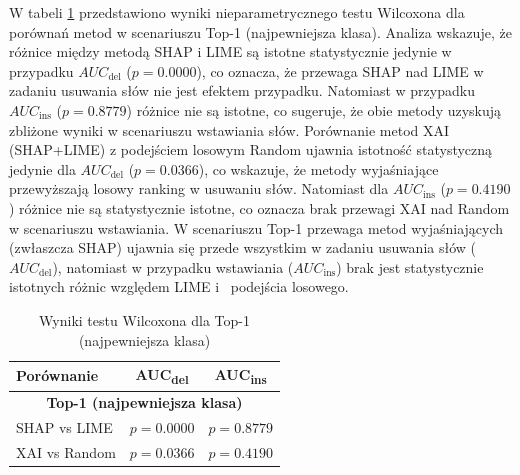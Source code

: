\documentclass[wmii, inf, mgr]{uwmthesis}
\begin{document}
W tabeli \ref{tab:wilcoxon_top1} przedstawiono wyniki nieparametrycznego testu Wilcoxona dla porównań metod w scenariuszu Top-1 (najpewniejsza klasa). Analiza wskazuje, że różnice między metodą SHAP i LIME są istotne statystycznie jedynie w przypadku $AUC_{\text{del}}$ ($p = 0.0000$), co oznacza, że przewaga SHAP nad LIME w zadaniu usuwania słów nie jest efektem przypadku. Natomiast w przypadku $AUC_{\text{ins}}$ ($p = 0.8779$) różnice nie są istotne, co sugeruje, że obie metody uzyskują zbliżone wyniki w scenariuszu wstawiania słów. Porównanie metod XAI (SHAP+LIME) z podejściem losowym Random ujawnia istotność statystyczną jedynie dla $AUC_{\text{del}}$ ($p = 0.0366$), co wskazuje, że metody wyjaśniające przewyższają losowy ranking w usuwaniu słów. Natomiast dla $AUC_{\text{ins}}$ ($p = 0.4190$) różnice nie są statystycznie istotne, co oznacza brak przewagi XAI nad Random w scenariuszu wstawiania. W scenariuszu Top-1 przewaga metod wyjaśniających (zwłaszcza SHAP) ujawnia się przede wszystkim w zadaniu usuwania słów ($AUC_{\text{del}}$), natomiast w przypadku wstawiania ($AUC_{\text{ins}}$) brak jest statystycznie istotnych różnic względem LIME i~ podejścia losowego.

\begin{table}[H]
	\centering
	\renewcommand{\arraystretch}{1.3}
	\begin{tabular}{|l|c|c|}
		\hline
		\textbf{Porównanie} & \textbf{AUC\textsubscript{del}} & \textbf{AUC\textsubscript{ins}} \\ \hline
		\multicolumn{3}{|c|}{\textbf{Top-1 (najpewniejsza klasa)}} \\ \hline
		SHAP vs LIME  & $p=0.0000$ & $p=0.8779$ \\ \hline
		XAI vs Random & $p=0.0366$ & $p=0.4190$ \\ \hline
	\end{tabular}
	\caption{Wyniki testu Wilcoxona dla Top-1 (najpewniejsza klasa)}
	\label{tab:wilcoxon_top1}
\end{table}
\end{document}
